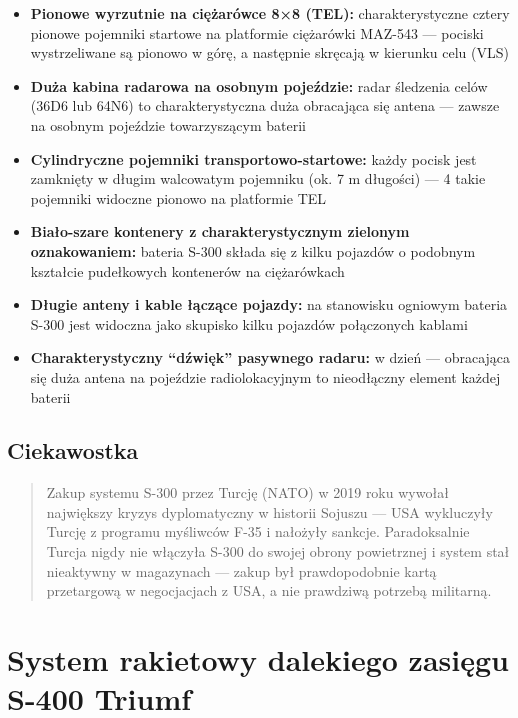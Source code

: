 \documentclass[12pt,openany,oneside]{book}
\providecommand{\tightlist}{%
  \setlength{\itemsep}{0pt}\setlength{\parskip}{0pt}}
\begin{document}
\begin{itemize}
\tightlist
\item
  \textbf{Pionowe wyrzutnie na ciężarówce 8×8 (TEL):} charakterystyczne
  cztery pionowe pojemniki startowe na platformie ciężarówki MAZ-543 ---
  pociski wystrzeliwane są pionowo w górę, a następnie skręcają w
  kierunku celu (VLS)
\item
  \textbf{Duża kabina radarowa na osobnym pojeździe:} radar śledzenia
  celów (36D6 lub 64N6) to charakterystyczna duża obracająca się antena
  --- zawsze na osobnym pojeździe towarzyszącym baterii
\item
  \textbf{Cylindryczne pojemniki transportowo-startowe:} każdy pocisk
  jest zamknięty w długim walcowatym pojemniku (ok. 7 m długości) --- 4
  takie pojemniki widoczne pionowo na platformie TEL
\item
  \textbf{Biało-szare kontenery z charakterystycznym zielonym
  oznakowaniem:} bateria S-300 składa się z kilku pojazdów o podobnym
  kształcie pudełkowych kontenerów na ciężarówkach
\item
  \textbf{Długie anteny i kable łączące pojazdy:} na stanowisku ogniowym
  bateria S-300 jest widoczna jako skupisko kilku pojazdów połączonych
  kablami
\item
  \textbf{Charakterystyczny ``dźwięk'' pasywnego radaru:} w dzień ---
  obracająca się duża antena na pojeździe radiolokacyjnym to nieodłączny
  element każdej baterii
\end{itemize}

\section{Ciekawostka}\label{ciekawostka-27}

\begin{quote}
Zakup systemu S-300 przez Turcję (NATO) w 2019 roku wywołał największy
kryzys dyplomatyczny w historii Sojuszu --- USA wykluczyły Turcję z
programu myśliwców F-35 i nałożyły sankcje. Paradoksalnie Turcja nigdy
nie włączyła S-300 do swojej obrony powietrznej i system stał nieaktywny
w magazynach --- zakup był prawdopodobnie kartą przetargową w
negocjacjach z USA, a nie prawdziwą potrzebą militarną.
\end{quote}

\chapter{System rakietowy dalekiego zasięgu S-400
Triumf}\label{system-rakietowy-dalekiego-zasiux119gu-s-400-triumf}
\end{document}
